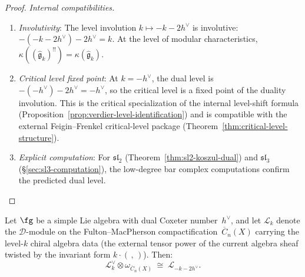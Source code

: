 \begin{proof}
\emph{Internal compatibilities.}
\begin{enumerate}
\item \emph{Involutivity}: The level involution $k \mapsto -k - 2h^\vee$ is involutive: $-(-k-2h^\vee) - 2h^\vee = k$. At the level of modular characteristics, $\kappa((\widehat{\mathfrak{g}}_k)^{!!}) = \kappa(\widehat{\mathfrak{g}}_k)$.
\item \emph{Critical level fixed point}: At $k = -h^\vee$, the dual level is $-(-h^\vee) - 2h^\vee = -h^\vee$, so the critical level is a fixed point of the duality involution. This is the critical specialization of the internal level-shift formula (Proposition~\ref{prop:verdier-level-identification}) and is compatible with the external Feigin--Frenkel critical-level package (Theorem~\ref{thm:critical-level-structure}).
\item \emph{Explicit computation}: For $\mathfrak{sl}_2$ (Theorem~\ref{thm:sl2-koszul-dual}) and $\mathfrak{sl}_3$ (\S\ref{sec:sl3-computation}), the low-degree bar complex computations confirm the predicted dual level.
\end{enumerate}
\end{proof}

\begin{proposition}
\label{prop:verdier-level-identification}
Let $\fg$ be a simple Lie algebra with dual Coxeter number~$h^\vee$,
and let $\mathcal{L}_k$ denote the $\mathcal{D}$-module on the
Fulton--MacPherson compactification~$\overline{C}_n(X)$ carrying the
level-$k$ chiral algebra data
\textup{(}the external tensor power of the current algebra sheaf
twisted by the invariant form $k \cdot (\,,\,)$\textup{)}.
Then:
\begin{equation}\label{eq:verdier-level-shift}
\mathcal{L}_k^\vee \otimes \omega_{\overline{C}_n(X)}
\;\cong\; \mathcal{L}_{-k - 2h^\vee}.
\end{equation}
\end{proposition}

